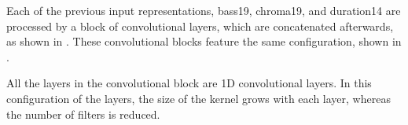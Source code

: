 

Each of the previous input representations, \gls{bass19},
\gls{chroma19}, and \gls{duration14} are processed by a
block of convolutional layers, which are concatenated
afterwards, as shown in . These
convolutional blocks feature the same configuration, shown
in .



All the layers in the convolutional block are 1D
convolutional layers. In this configuration of the layers,
the size of the kernel grows with each layer, whereas the
number of filters is reduced.

